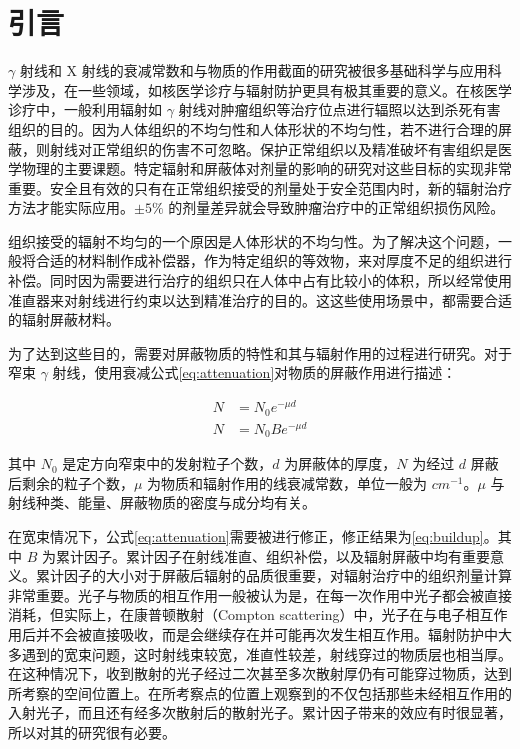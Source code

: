 \section{引言}

$\gamma$ 射线和 X 射线的衰减常数和与物质的作用截面的研究被很多基础科学与应用科学涉及，在一些领域，如核医学诊疗与辐射防护更具有极其重要的意义\cite{kerur_mass_2009}。在核医学诊疗中，一般利用辐射如 $\gamma$ 射线对肿瘤组织等治疗位点进行辐照以达到杀死有害组织的目的。因为人体组织的不均匀性和人体形状的不均匀性，若不进行合理的屏蔽，则射线对正常组织的伤害不可忽略。保护正常组织以及精准破坏有害组织是医学物理的主要课题。特定辐射和屏蔽体对剂量的影响的研究对这些目标的实现非常重要\cite{ding_need_2007}。安全且有效的只有在正常组织接受的剂量处于安全范围内时，新的辐射治疗方法才能实际应用。$\pm5\%$ 的剂量差异就会导致肿瘤治疗中的正常组织损伤风险\cite{dische_precision_1993}。

组织接受的辐射不均匀的一个原因是人体形状的不均匀性。为了解决这个问题，一般将合适的材料制作成补偿器，作为特定组织的等效物，来对厚度不足的组织进行补偿\cite{foster_influence_2009}。同时因为需要进行治疗的组织只在人体中占有比较小的体积，所以经常使用准直器来对射线进行约束以达到精准治疗的目的。这这些使用场景中，都需要合适的辐射屏蔽材料\cite{zhu_intensity-modulated_2005}。

为了达到这些目的，需要对屏蔽物质的特性和其与辐射作用的过程进行研究。对于窄束 $\gamma$ 射线，使用衰减公式\eqref{eq:attenuation}对物质的屏蔽作用进行描述\cite{foster_influence_2009}：

\begin{align}
    N &= N_0 e^{-\mu d} \label{eq:attenuation} \\
    N &= N_0 B e^{-\mu d} \label{eq:buildup}
\end{align}

其中 $N_0$ 是定方向窄束中的发射粒子个数，$d$ 为屏蔽体的厚度，$N$ 为经过 $d$ 屏蔽后剩余的粒子个数，$\mu$ 为物质和辐射作用的线衰减常数，单位一般为 $\si{cm^{-1}}$。$\mu$ 与射线种类、能量、屏蔽物质的密度与成分均有关。

在宽束情况下，公式\eqref{eq:attenuation}需要被进行修正，修正结果为\eqref{eq:buildup}。其中 $B$ 为累计因子。累计因子在射线准直、组织补偿，以及辐射屏蔽中均有重要意义。累计因子的大小对于屏蔽后辐射的品质很重要，对辐射治疗中的组织剂量计算非常重要。光子与物质的相互作用一般被认为是，在每一次作用中光子都会被直接消耗，但实际上，在康普顿散射（Compton scattering）中，光子在与电子相互作用后并不会被直接吸收，而是会继续存在并可能再次发生相互作用。辐射防护中大多遇到的宽束问题，这时射线束较宽，准直性较差，射线穿过的物质层也相当厚。在这种情况下，收到散射的光子经过二次甚至多次散射厚仍有可能穿过物质，达到所考察的空间位置上。在所考察点的位置上观察到的不仅包括那些未经相互作用的入射光子，而且还有经多次散射后的散射光子。累计因子带来的效应有时很显著，所以对其的研究很有必要。

